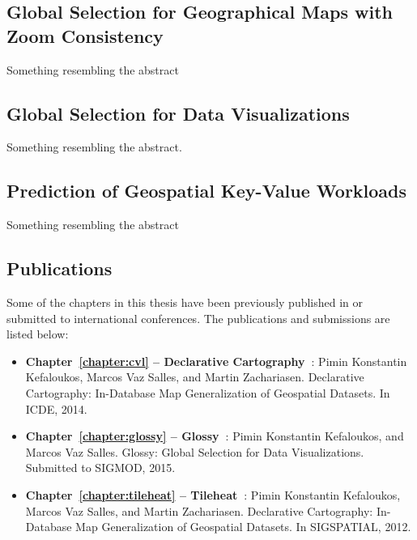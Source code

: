 \documentclass[11pt, oneside]{report}
\begin{document}
 
\subsection{Global Selection for Geographical Maps with Zoom Consistency}
\label{sec:introduction:contributions:cvl}

Something resembling the abstract

\subsection{Global Selection for Data Visualizations}
\label{sec:introduction:contributions:glossy}

Something resembling the abstract. 

\subsection{Prediction of Geospatial Key-Value Workloads}
\label{sec:introduction:contributions:tileheat}

Something resembling the abstract

\subsection{Publications}

Some of the chapters in this thesis have been previously published in or submitted to international conferences. The publications and submissions are listed below: 

\begin{itemize}
\item \textbf{Chapter~\ref{chapter:cvl} -- Declarative Cartography~\cite{declarative:cartography}}: Pimin Konstantin Kefaloukos, Marcos Vaz Salles, and Martin Zachariasen. Declarative Cartography: In-Database Map Generalization of Geospatial Datasets. In ICDE, 2014. 
\item \textbf{Chapter~\ref{chapter:glossy} -- Glossy~\cite{glossy}}: Pimin Konstantin Kefaloukos, and Marcos Vaz Salles. Glossy: Global Selection for Data Visualizations. Submitted to SIGMOD, 2015. 
\item \textbf{Chapter~\ref{chapter:tileheat} -- Tileheat~\cite{tileheat}}: Pimin Konstantin Kefaloukos, Marcos Vaz Salles, and Martin Zachariasen. Declarative Cartography: In-Database Map Generalization of Geospatial Datasets. In SIGSPATIAL, 2012. 
\end{itemize}
\end{document}
